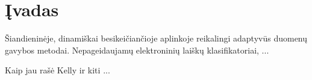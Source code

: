 
\thispagestyle{plain}

\section{\texorpdfstring{\lithuanian Įvadas}{\k{I}vadas}}
\label{sec:intro}

\lithuanian

Šiandieninėje, dinamiškai besikeičiančioje aplinkoje reikalingi adaptyvūs duomenų gavybos metodai. 
Nepageidaujamų elektroninių laiškų klasifikatoriai, ...

Kaip jau rašė Kelly ir kiti \cite{Kelly99} ...